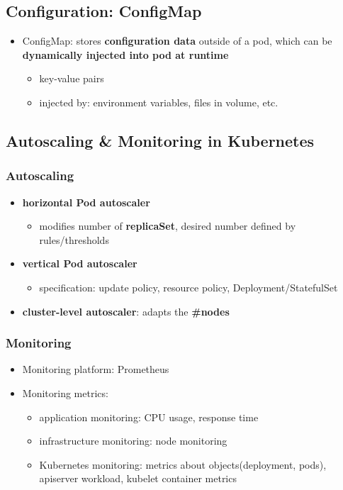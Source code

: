 \subsection{Configuration: ConfigMap}
\begin{itemize}
	\item ConfigMap: stores \textbf{configuration data} outside of a pod, which can be \textbf{dynamically injected into pod at runtime}
	\begin{itemize}
		\item key-value pairs
		\item injected by: environment variables, files in volume, etc.
	\end{itemize}
\end{itemize}

\subsection{Autoscaling \& Monitoring in Kubernetes}

\subsubsection{Autoscaling}
\begin{itemize}
	\item \textbf{horizontal Pod autoscaler}
	\begin{itemize}
		\item modifies number of \textbf{replicaSet}, desired number defined by rules/thresholds
	\end{itemize}
	\item \textbf{vertical Pod autoscaler}
	\begin{itemize}
		\item specification: update policy, resource policy, Deployment/StatefulSet
	\end{itemize}
	\item \textbf{cluster-level autoscaler}: adapts the \textbf{\#nodes}
\end{itemize}

\subsubsection{Monitoring}
\begin{itemize}
	\item Monitoring platform: Prometheus
	\item Monitoring metrics:
	\begin{itemize}
		\item application monitoring: CPU usage, response time
		\item infrastructure monitoring: node monitoring
		\item Kubernetes monitoring: metrics about objects(deployment, pods), apiserver workload, kubelet container metrics
	\end{itemize}
\end{itemize}